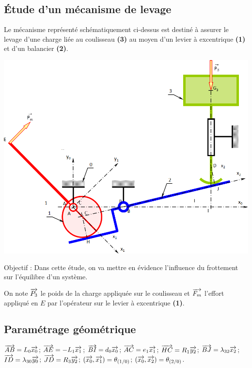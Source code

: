 \documentclass[10pt,fleqn]{article} %
\begin{document}

\vspace{6cm}
\pagestyle{fancy}
\thispagestyle{plain}


\def\columnseprulecolor{\color{ocre}}
\setlength{\columnseprule}{0.4pt} 

\ifprof
\else
\begin{multicols}{2}
\fi
\section*{Étude d'un mécanisme de levage}
Le mécanisme représenté schématiquement ci-dessus est destiné à assurer le levage d’une charge liée au coulisseau \textbf{(3)} au moyen d’un levier à excentrique \textbf{(1)} et d’un balancier \textbf{(2)}.

\begin{center}
\includegraphics[width=\linewidth]{images/fig_01}
\end{center}
\begin{obj}
Objectif : Dans cette étude, on va mettre en évidence l’influence du frottement sur l’équilibre d’un système.
\end{obj}

On note  $\overrightarrow{P_3}$ le poids de la charge appliquée sur le coulisseau et $\overrightarrow{F_m}$ l’effort appliqué en $E$ par l’opérateur sur le levier à excentrique \textbf{(1)}.

\subsection*{Paramétrage géométrique}
$\overrightarrow{AB}=L_0\overrightarrow{x_0}$; 
$\overrightarrow{AE}=-L_1\overrightarrow{x_1}$; 
$\overrightarrow{BI}=d_0\overrightarrow{x_0}$; 
$\overrightarrow{AC}=e_1\overrightarrow{x_1}$; 
$\overrightarrow{HC}=R_1\overrightarrow{y_2}$; 
$\overrightarrow{BJ}=\lambda_{32}\overrightarrow{x_2}$; 
$\overrightarrow{ID}=\lambda_{30}\overrightarrow{y_0}$; 
$\overrightarrow{JD}=R_3\overrightarrow{y_2}$; 
$\left(\overrightarrow{x_0},\overrightarrow{x_1} \right)=\theta_{\left(1/0\right)}$; 
$\left(\overrightarrow{x_0},\overrightarrow{x_2} \right)=\theta_{\left(2/0\right)}$.
 	 	 	 	 


\end{multicols}
\end{document}

